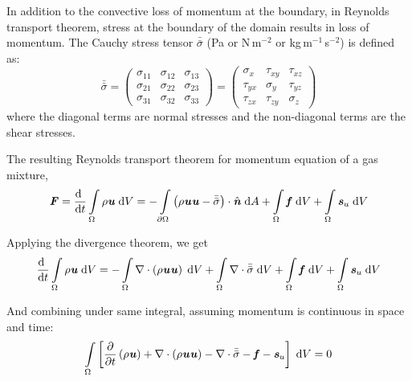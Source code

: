 In addition to the convective loss of momentum at the boundary, in Reynolds transport theorem, stress at the boundary of the domain results in loss of momentum. The Cauchy stress tensor $\bar{\bar{\sigma}}$ (Pa or N\,m$^{-2}$ or kg\,m$^{-1}$\,s$^{-2}$) is defined as:
\begin{equation}
\bar{\bar{\sigma}} = \left( {\begin{array}{*{20}{c}}
	{{\sigma _{11}}}&{{\sigma _{12}}}&{{\sigma _{13}}}\\
	{{\sigma _{21}}}&{{\sigma _{22}}}&{{\sigma _{23}}}\\
	{{\sigma _{31}}}&{{\sigma _{32}}}&{{\sigma _{33}}}
	\end{array}} \right) = \left( {\begin{array}{*{20}{c}}
	{{\sigma _x}}&{{\tau _{xy}}}&{{\tau _{xz}}}\\
	{{\tau _{yx}}}&{{\sigma _y}}&{{\tau _{yz}}}\\
	{{\tau _{zx}}}&{{\tau _{zy}}}&{{\sigma _z}}
	\end{array}} \right)
\end{equation}
where the diagonal terms are normal stresses and the non-diagonal terms are the shear stresses. 



The resulting Reynolds transport theorem for momentum equation of a gas mixture, 
\begin{equation}
{\textbf{\textit{F}}} = \frac{\mathrm{d}~}{{\mathrm{d}t}} \int \limits_\Omega  {\rho }{{\textbf{\textit{u}}}}\;\mathrm{d}V =  - \int \limits_{\partial\Omega}  \left( \rho \textbf{\textit{u}}\textbf{\textit{u}} - \bar{\bar{\sigma}}\right) \cdot \hat{\textbf{\textit{n}}}\;\mathrm{d}A + \int \limits_\Omega \textbf{\textit{f}}\; \mathrm{d}V + \int \limits_\Omega \textbf{\textit{s}}_{u}\; \mathrm{d}V
\end{equation}

Applying the divergence theorem, we get
\begin{equation}
\frac{\mathrm{d}~}{{\mathrm{d}t}} \int \limits_\Omega  {\rho }{{\textbf{\textit{u}}}}\;\mathrm{d}V =  - \int \limits_{\Omega}  \nabla \cdot \left(\rho \textbf{\textit{u}} \textbf{\textit{u}} \right)\; \mathrm{d}V +  \int \limits_\Omega \nabla \cdot \bar{\bar{{\sigma}}}\;\mathrm{d}V + \int \limits_\Omega \textbf{\textit{f}}\; \mathrm{d}V + \int \limits_\Omega \textbf{\textit{s}}_{u}\; \mathrm{d}V
\end{equation}

And combining under same integral, assuming momentum is continuous in space and time:
\begin{equation}
\int \limits_\Omega \left[ \frac{\partial}{\partial t} \left(\rho \textbf{\textit{u}} \right) + \nabla \cdot \left(\rho \textbf{\textit{u}}\textbf{\textit{u}} \right) - \nabla \cdot \bar{\bar{{\sigma}}} - \textbf{\textit{f}} -  \textbf{\textit{s}}_{u} \right]\; \mathrm{d}V = 0
\end{equation}

